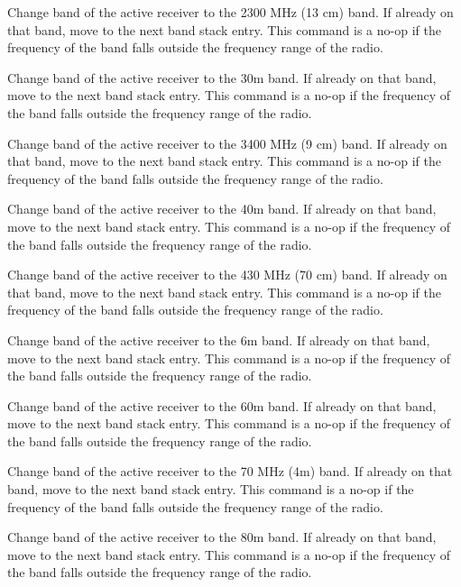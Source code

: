 \documentclass[12pt]{book}
\begin{document}
{Change band of the active receiver to the 2300 MHz (13 cm) band. If already on that band, move to
the next band stack entry. This command is a no-op if the frequency of the band falls outside the frequency
range of the radio.}

{Change band of the active receiver to the 30m band. If already on that band, move to
the next band stack entry. This command is a no-op if the frequency of the band falls outside the frequency
range of the radio.}

{Change band of the active receiver to the 3400 MHz (9 cm) band. If already on that band, move to
the next band stack entry. This command is a no-op if the frequency of the band falls outside the frequency
range of the radio.}

{Change band of the active receiver to the 40m band. If already on that band, move to
the next band stack entry. This command is a no-op if the frequency of the band falls outside the frequency
range of the radio.}

{Change band of the active receiver to the 430 MHz (70 cm) band. If already on that band, move to
the next band stack entry. This command is a no-op if the frequency of the band falls outside the frequency
range of the radio.}

{Change band of the active receiver to the 6m band. If already on that band, move to
the next band stack entry. This command is a no-op if the frequency of the band falls outside the frequency
range of the radio.}

{Change band of the active receiver to the 60m band. If already on that band, move to
the next band stack entry. This command is a no-op if the frequency of the band falls outside the frequency
range of the radio.}

{Change band of the active receiver to the 70 MHz (4m)  band. If already on that band, move to
the next band stack entry. This command is a no-op if the frequency of the band falls outside the frequency
range of the radio.}

{Change band of the active receiver to the 80m band. If already on that band, move to
the next band stack entry. This command is a no-op if the frequency of the band falls outside the frequency
range of the radio.}
\end{document}
